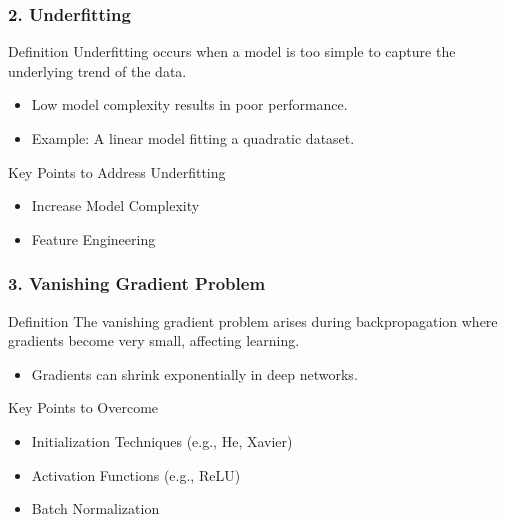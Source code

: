 \documentclass[aspectratio=169]{beamer}
\begin{document}
\begin{frame}[fragile]
    \frametitle{2. Underfitting}
    
    \begin{block}{Definition}
        Underfitting occurs when a model is too simple to capture the underlying trend of the data. 
    \end{block}
    
    \begin{itemize}
        \item Low model complexity results in poor performance.
        \item Example: A linear model fitting a quadratic dataset.
    \end{itemize}
    
    \begin{block}{Key Points to Address Underfitting}
        \begin{itemize}
            \item Increase Model Complexity
            \item Feature Engineering
        \end{itemize}
    \end{block}
\end{frame}

\begin{frame}[fragile]
    \frametitle{3. Vanishing Gradient Problem}
    
    \begin{block}{Definition}
        The vanishing gradient problem arises during backpropagation where gradients become very small, affecting learning.
    \end{block}
    
    \begin{itemize}
        \item Gradients can shrink exponentially in deep networks.
    \end{itemize}
    
    \begin{block}{Key Points to Overcome}
        \begin{itemize}
            \item Initialization Techniques (e.g., He, Xavier)
            \item Activation Functions (e.g., ReLU)
            \item Batch Normalization
        \end{itemize}
    \end{block}
\end{frame}
\end{document}
